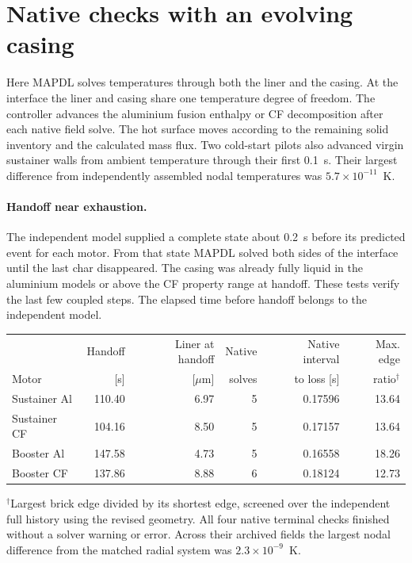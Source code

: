 \section{Native checks with an evolving casing}\label{sec:coupledends}
Here MAPDL solves temperatures through both the liner and the casing.
At the interface the liner and casing share one temperature degree of freedom.
The controller advances the aluminium fusion enthalpy or CF decomposition
after each native field solve. The hot surface moves according to the remaining
solid inventory and the calculated mass flux. Two cold-start pilots also
advanced virgin sustainer walls from ambient temperature through their first
0.1~s. Their largest difference from independently assembled nodal temperatures
was $5.7\times 10^{-11}$~K.

\paragraph{Handoff near exhaustion.} The independent model supplied a complete
state about 0.2~s before its predicted event for each motor. From that state
MAPDL solved both sides of the interface until the last char disappeared. The
casing was already fully liquid in the aluminium models or above the CF
property range at handoff. These tests verify the last few coupled steps. The
elapsed time before handoff belongs to the independent model.

\begin{center}\small\begin{tabular}{lrrrrr}\toprule
& Handoff & Liner at handoff & Native & Native interval & Max. edge\\
Motor & [s] & [$\mu$m] & solves & to loss [s] & ratio$^\dagger$\\\midrule
Sustainer Al & 110.40 & 6.97 & 5 & 0.17596 & 13.64 \\
Sustainer CF & 104.16 & 8.50 & 5 & 0.17157 & 13.64 \\
Booster Al & 147.58 & 4.73 & 5 & 0.16558 & 18.26 \\
Booster CF & 137.86 & 8.88 & 6 & 0.18124 & 12.73 \\
\bottomrule\end{tabular}\end{center}
\noindent $^\dagger$Largest brick edge divided by its shortest edge, screened
over the independent full history using the revised geometry.
All four native terminal checks finished without a solver warning or error.
Across their archived fields the largest nodal difference from the matched
radial system was $2.3\times 10^{-9}$~K.

